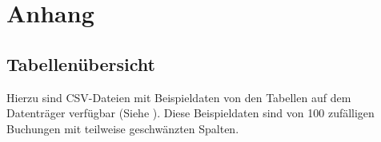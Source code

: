 \appendix
\chapter{Anhang}
\vspace{-1cm}
\section{Tabellenübersicht}

Hierzu sind CSV-Dateien mit Beispieldaten von den Tabellen auf dem Datenträger verfügbar (Siehe ). Diese Beispieldaten sind von 100 zufälligen Buchungen mit teilweise geschwänzten Spalten.

\printnoidxglossary[type=tablenames, nonumberlist]
